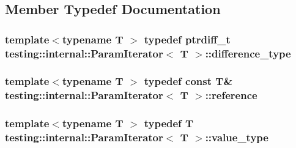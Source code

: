 \subsection{Member Typedef Documentation}
\hypertarget{classtesting_1_1internal_1_1_param_iterator_a6c37240a04ba3fc4c56f6c413cf4771d}{
\subsubsection[{difference\-\_\-type}]{\setlength{\rightskip}{0pt plus 5cm}template$<$typename T $>$ typedef ptrdiff\-\_\-t {\bf testing\-::internal\-::\-Param\-Iterator}$<$ T $>$\-::{\bf difference\-\_\-type}}}\label{classtesting_1_1internal_1_1_param_iterator_a6c37240a04ba3fc4c56f6c413cf4771d}
\hypertarget{classtesting_1_1internal_1_1_param_iterator_ac96f133ffa06fc0f9faff5a1c7954382}{
\subsubsection[{reference}]{\setlength{\rightskip}{0pt plus 5cm}template$<$typename T $>$ typedef const T\& {\bf testing\-::internal\-::\-Param\-Iterator}$<$ T $>$\-::{\bf reference}}}\label{classtesting_1_1internal_1_1_param_iterator_ac96f133ffa06fc0f9faff5a1c7954382}
\hypertarget{classtesting_1_1internal_1_1_param_iterator_a4afe3a68db0d0744753c8afe262e35df}{
\subsubsection[{value\-\_\-type}]{\setlength{\rightskip}{0pt plus 5cm}template$<$typename T $>$ typedef T {\bf testing\-::internal\-::\-Param\-Iterator}$<$ T $>$\-::{\bf value\-\_\-type}}}\label{classtesting_1_1internal_1_1_param_iterator_a4afe3a68db0d0744753c8afe262e35df}


